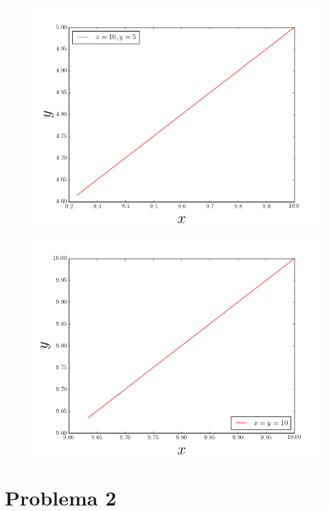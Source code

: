 \documentclass[a4paper,10pt]{article}
\numberwithin{equation}{section}
\begin{document}
\begin{multicols}{2}
\begin{figure}[H]
\centering
\includegraphics[scale=0.33]{problema1fig6}
\label{fig:problema1fig6}
\end{figure}

\begin{figure}[H]
\centering
\includegraphics[scale=0.33]{problema1fig7}
\label{fig:problema1fig7}
\end{figure}
\end{multicols}

\newpage

\section{Problema 2}
\end{document}
